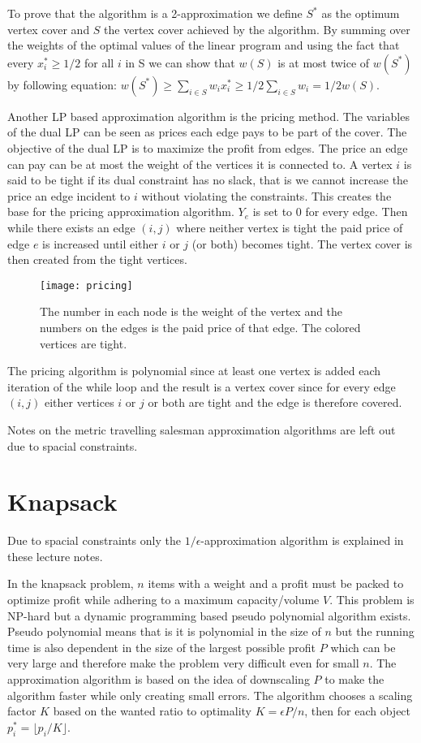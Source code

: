 To prove that the algorithm is a 2-approximation we define $S^*$ as the optimum vertex cover and $S$ the vertex cover achieved by the algorithm. By summing over the weights of the optimal values of the linear program and using the fact that every $x^*_i \ge 1/2$ for all $i$ in S we can show that $w(S)$ is at most twice of $w(S^*)$ by following equation: $w(S^*) \ge \sum_{i \in S} w_i x^*_i \ge 1/2 \sum_{i \in S} w_i = 1/2 w(S)$.

\newpar Another LP based approximation algorithm is the pricing method. The variables of the dual LP can be seen as prices each edge pays to be part of the cover. The objective of the dual LP is to maximize the profit from edges. The price an edge can pay can be at most the weight of the vertices it is connected to. A vertex $i$ is said to be tight if its dual constraint has no slack, that is we cannot increase the price an edge incident to $i$ without violating the constraints. This creates the base for the pricing approximation algorithm. $Y_e$ is set to 0 for every edge. Then while there exists an edge $(i,j)$ where neither vertex is tight the paid price of edge $e$ is increased until either $i$ or $j$ (or both) becomes tight. The vertex cover is then created from the tight vertices.

\begin{figure}[H]
    \centering
    \texttt{[image: pricing]}
    \caption{The number in each node is the weight of the vertex and the numbers on the edges is the paid price of that edge. The colored vertices are tight.}
\end{figure}

The pricing algorithm is polynomial since at least one vertex is added each iteration of the while loop and the result is a vertex cover since for every edge $(i,j)$ either vertices $i$ or $j$ or both are tight and the edge is therefore covered. 

\newpar Notes on the metric travelling salesman approximation algorithms are left out due to spacial constraints.

\section{Knapsack}
Due to spacial constraints only the $1/\epsilon$-approximation algorithm is explained in these lecture notes. 

In the knapsack problem, $n$ items with a weight and a profit must be packed to optimize profit while adhering to a maximum capacity/volume $V$. This problem is NP-hard but a dynamic programming based pseudo polynomial algorithm exists. Pseudo polynomial means that is it is polynomial in the size of $n$ but the running time is also dependent in the size of the largest possible profit $P$ which can be very large and therefore make the problem very difficult even for small $n$. The approximation algorithm is based on the idea of downscaling $P$ to make the algorithm faster while only creating small errors. The algorithm chooses a scaling factor $K$ based on the wanted ratio to optimality $K=\epsilon P/n$, then for each object $p^*_i = \lfloor p_i/K \rfloor$.


